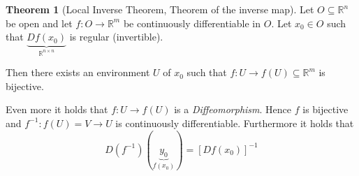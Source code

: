 \documentclass[a4paper,landscape,twocolumn]{article}
\theoremstyle{definition}
\newtheorem{theorem}{Theorem}
\begin{document}
\begin{theorem}[Local Inverse Theorem, Theorem of the inverse map]
  Let $O \subseteq \mathbb R^n$ be open and let $f: O \to \mathbb R^m$ be
  continuously differentiable in $O$. Let $x_0 \in O$ such that
  $\underbrace{Df(x_0)}_{\mathbb R^{n\times n}}$  is regular (invertible).

  Then there exists an environment $U$ of $x_0$ such that $f: U \to f(U) \subseteq \mathbb R^m$ is bijective.

  Even more it holds that $f: U \to f(U)$ is a \emph{Diffeomorphism}.
  Hence $f$ is bijective and $f^{-1}: f(U) = V \to U$ is continuously differentiable.
  Furthermore it holds that
  \[ D(f^{-1})(\underbrace{y_0}_{f(x_0)}) = \left[Df(x_0)\right]^{-1} \]
\end{theorem}
\end{document}
